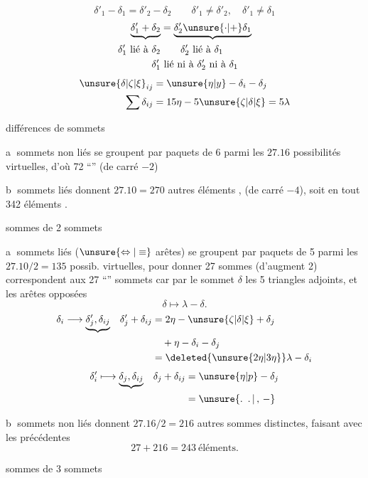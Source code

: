 \[
\delta'_1-\delta_1=\delta'_2-\delta_2\qquad
\delta'_1\ne\delta'_2,\quad\delta'_1\ne\delta_1
\]
\[
\begin{aligned}
\underbrace{\delta'_1+\delta_2}&=\underbrace{\delta'_2\unsure{\cdot|+}\delta_1}\\
\delta'_1\ \text{lié à }\delta_2 &\qquad \delta'_2\ \text{lié à }\delta_1\\
\delta'_1&\ \text{lié ni à }\delta'_2\ \text{ni à }\delta_1
\end{aligned}
\]
\[
\begin{aligned}
\unsure{\delta|\zeta|\xi}_{ij}&=\unsure{\eta|y}-\delta_i-\delta_j\\
\sum\delta_{ij}&=15\eta-5\unsure{\zeta|\delta|\xi}=5\lambda
\end{aligned}
\]

différences de sommets

\textcircled{a} sommets non liés se groupent par paquets de 6 parmi les $27.16$ possibilités virtuelles, d'où 72 ``'' (de carré $-2$)

\textcircled{b} sommets liés donnent $27.10=270$ autres éléments ,   (de carré $-4$), soit en tout 342 éléments .

sommes de 2 sommets

\textcircled{a} sommets  liés ($\unsure{\Leftrightarrow|\equiv}$ arêtes) se groupent par paquets de 5 parmi les  $27.10/2=135$ possib. virtuelles, pour donner 27 sommes (d'augment 2) correspondent aux 27 ``'' sommets car  par le sommet $\delta$ les 5  triangles adjoints, et les arêtes opposées
\[
\delta\longmapsto\lambda-\delta.
\]
\[
\begin{aligned}
\delta_i&\longrightarrow\underbrace{\delta'_j,\delta_{ij}}&
\delta'_j+\delta_{ij}&=2\eta-\unsure{\zeta|\delta|\xi}+\delta_j\\
&&&\quad{}+\eta-\delta_i-\delta_j\\
&&&=\deleted{\unsure{2\eta|3\eta}}\lambda-\delta_i
\end{aligned}
\]
\[
\begin{aligned}
\delta'_i &\longmapsto\underbrace{\delta_j,\delta_{ij}}&
\delta_j+\delta_{ij}&=\unsure{\eta|p}-\delta_j\\
&&&=\unsure{\ldotp\ \ldotp|\, ,\, -}
\end{aligned}
\]

\textcircled{b}  sommets non liés  donnent $27.16/2=216$ autres sommes distinctes, faisant avec les précédentes
\[
27+216=243\ \text{éléments.}
\]

sommes de 3 sommets
